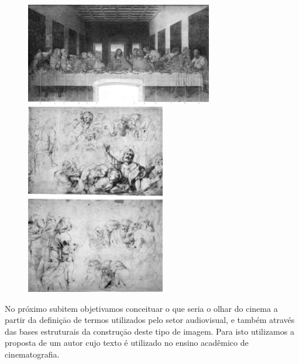 \begin{figure}
\begin{minipage}[b]{3.21905in}
	\caption[]{\footnotemark}
	\includegraphics[width=3.21905in]{figuras/leonardo-ultima-ceia-1498.pdf}
\end{minipage}\hfill
\begin{minipage}[t]{2.69403in}
	\caption{}
	\includegraphics[width=2.39403in]{figuras/rubens-desenhos-selecionados-1986.pdf}
\end{minipage}
\end{figure}


No próximo subitem objetivamos conceituar o que seria o olhar do cinema
a partir da definiçāo de termos utilizados pelo setor audiovisual, e
também através das bases estruturais da construçāo deste tipo de
imagem. Para isto utilizamos a proposta de um autor cujo texto é
utilizado no ensino acadêmico de cinematografia.

